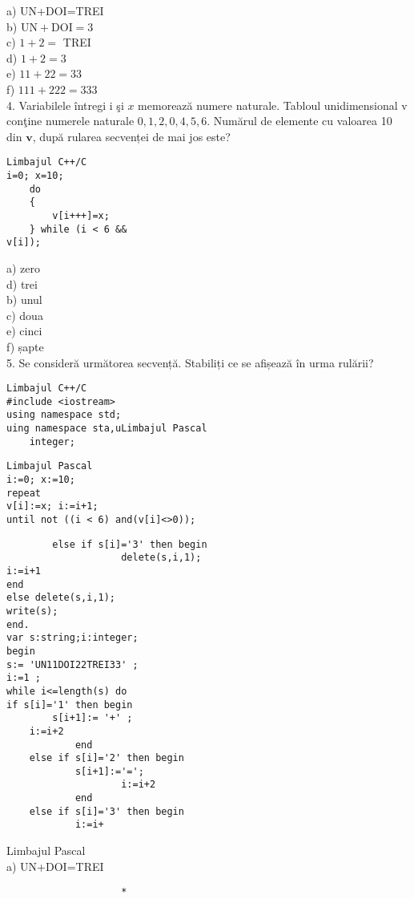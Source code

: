 a) UN+DOI=TREI\\
b) $\mathrm{UN}+\mathrm{DOI}=3$\\
c) $1+2=$ TREI\\
d) $1+2=3$\\
e) $11+22=33$\\
f) $111+222=333$\\
4. Variabilele întregi i şi $x$ memorează numere naturale. Tabloul unidimensional v conţine numerele naturale $0,1,2,0,4,5,6$. Numărul de elemente cu valoarea 10 din $\mathbf{v}$, după rularea secvenței de mai jos este?

\begin{verbatim}
Limbajul C++/C
i=0; x=10;
    do
    {
        v[i+++]=x;
    } while (i < 6 &&
v[i]);
\end{verbatim}

a) zero\\
d) trei\\
b) unul\\
c) doua\\
e) cinci\\
f) șapte\\
5. Se consideră următorea secvență. Stabiliți ce se afișează în urma rulării?

\begin{verbatim}
Limbajul C++/C
#include <iostream>
using namespace std;
uing namespace sta,uLimbajul Pascal
    integer;
\end{verbatim}

\begin{verbatim}
Limbajul Pascal
i:=0; x:=10;
repeat
v[i]:=x; i:=i+1;
until not ((i < 6) and(v[i]<>0));
\end{verbatim}

\begin{verbatim}
        else if s[i]='3' then begin
                    delete(s,i,1);
i:=i+1
end
else delete(s,i,1);
write(s);
end.
var s:string;i:integer;
begin
s:= 'UN11DOI22TREI33' ;
i:=1 ;
while i<=length(s) do
if s[i]='1' then begin
        s[i+1]:= '+' ;
    i:=i+2
            end
    else if s[i]='2' then begin
            s[i+1]:='=';
                    i:=i+2
            end
    else if s[i]='3' then begin
            i:=i+
\end{verbatim}

Limbajul Pascal\\
a) UN+DOI=TREI

\begin{verbatim}
                    *
\end{verbatim}

